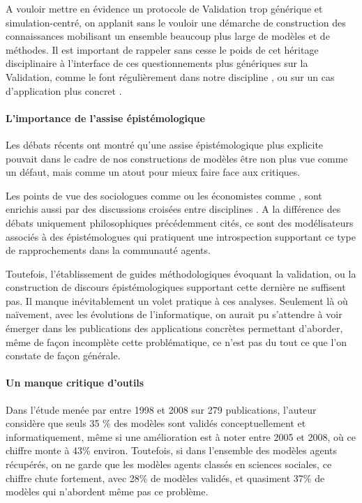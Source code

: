 A vouloir mettre en évidence un protocole de Validation trop générique et simulation-centré, on applanit sans le vouloir une démarche de construction des connaissances mobilisant un ensemble beaucoup plus large de modèles et de méthodes. Il est important de rappeler sans cesse le poids de cet héritage disciplinaire à l'interface de ces questionnements plus génériques sur la Validation, comme le font régulièrement dans notre discipline \textcites{Besse2000, Sanders2000, Mathian2014}, ou sur un cas d'application plus concret \textcites{Cottineau2014a, Cottineau2014b}.

\paragraph{L'importance de l'assise épistémologique}

Les débats récents ont montré qu'une assise épistémologique plus explicite pouvait dans le cadre de nos constructions de modèles être non plus vue comme un défaut, mais comme un atout pour mieux faire face aux critiques.

Les points de vue des sociologues comme \autocites{Hedstrom2010, Elsenbroich2012, Squazzoni2010, Manzo2007, Gilbert2009, Conte2001} ou les économistes comme \autocite{Epstein1996, Phan2010}, sont enrichis aussi par des discussions croisées entre disciplines \autocites{Gilbert1995a,Amblard2006, Phan2010a, Livet2014, Varenne2013,Conte2012}. A la différence des débats uniquement philosophiques précédemment cités, ce sont des modélisateurs associés à des épistémologues qui pratiquent une introspection supportant ce type de rapprochements dans la communauté agents.

Toutefois, l'établissement de guides méthodologiques évoquant la validation, ou la construction de discours épistémologiques supportant cette dernière ne suffisent pas. Il manque inévitablement un volet pratique à ces analyses. Seulement là où naïvement, avec les évolutions de l'informatique, on aurait pu s'attendre à voir émerger dans les publications des applications concrètes permettant d'aborder, même de façon incomplète cette problématique, ce n'est pas du tout ce que l'on constate de façon générale.

\paragraph{Un manque critique d'outils}

Dans l'étude menée par \textcite{Heath2009} entre 1998 et 2008 sur 279 publications, l'auteur considère que seuls 35 \% des modèles sont validés conceptuellement et informatiquement, même si une amélioration est à noter entre 2005 et 2008, où ce chiffre monte à 43\% environ. Toutefois, si dans l'ensemble des modèles agents récupérés, on ne garde que les modèles agents classés en sciences sociales, ce chiffre chute fortement, avec 28\% de modèles validés, et quasiment 37\% de modèles qui n'abordent même pas ce problème.

